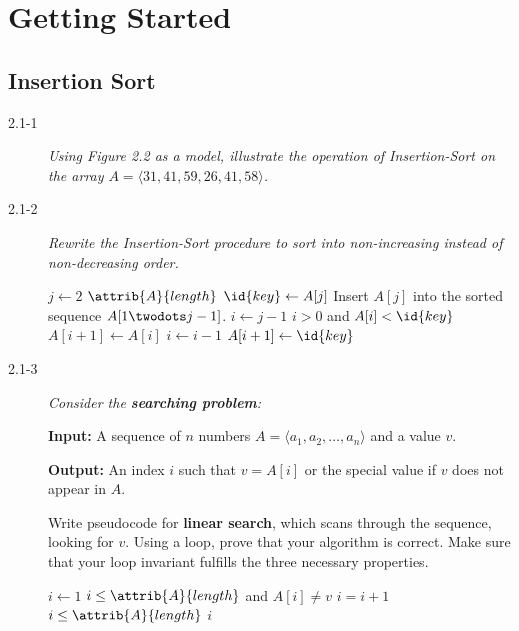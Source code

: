 \section{Getting Started}

\subsection{Insertion Sort}

\begin{description}

  \item[2.1-1] {\itshape Using Figure 2.2 as a model, illustrate the operation of {\sc Insertion-Sort} on the array $A = \langle 31, 41, 59, 26, 41, 58 \rangle$.}

    \begin{exrev}
      
    \end{exrev}

  \item[2.1-2] {\itshape Rewrite the {\sc Insertion-Sort} procedure to sort into non-increasing instead of non-decreasing order.}
    \begin{ex}
\begin{codebox}
  \li \For $j \gets 2$ \To $\attrib{A}{length}$
  \li \Do
  $\id{key} \gets A[j]$
  \li \Comment Insert $A[j]$ into the sorted sequence
  $A[1 \twodots j-1]$.
  \li $i \gets j-1$
  \li \While $i > 0$ and $A[i] < \id{key}$
  \li \Do
  $A[i+1] \gets A[i]$
  \li $i \gets i-1$
  \End
  \li $A[i+1] \gets \id{key}$
  \End
\end{codebox}
\end{ex}

\item[2.1-3] {\itshape Consider the {\bfseries searching problem}:

  {\bfseries Input:} A sequence of $n$ numbers $A = \langle a_1, a_2, \ldots, a_n \rangle$ and a value $v$.

  {\bfseries Output:} An index $i$ such that $v = A[i]$ or the special value  if $v$ does not appear in $A$.

Write pseudocode for {\bfseries linear search}, which scans through the sequence, looking for $v$. Using a loop, prove that your algorithm is correct. Make sure that your loop invariant fulfills the three necessary properties.}
  \begin{ex}
  \begin{codebox}
    \li $i\gets1$
    \li \While $i \le \attrib{A}{length}$ and $A[i]\ne v$
    \li \Do $i = i+1$ \End
    \li \If $i \le \attrib{A}{length}$ 
    \li \Then \Return $i$
    \li \Else
    \li \Return {}
    \End
  \end{codebox}


\end{ex}
\end{description}
